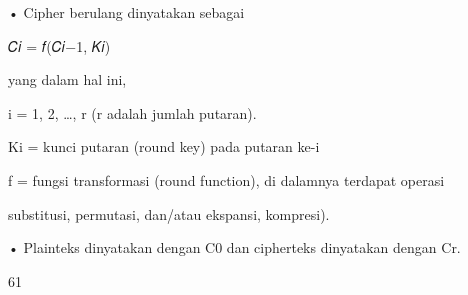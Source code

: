 \documentclass{article}
\begin{document}

• Cipher berulang dinyatakan sebagai




𝐶𝑖 = 𝑓(𝐶𝑖−1, 𝐾𝑖) 



    yang dalam hal ini,


i = 1, 2, …, r    (r adalah jumlah putaran). 


Ki = kunci putaran (round key) pada putaran ke-i


f = fungsi transformasi (round function), di dalamnya terdapat  operasi

                   substitusi, permutasi, dan/atau ekspansi, kompresi). 


• Plainteks  dinyatakan dengan C0 dan cipherteks dinyatakan dengan Cr.

61
\end{document}
